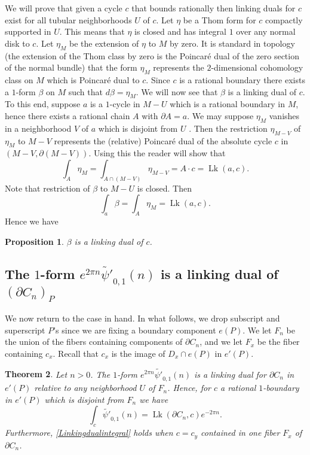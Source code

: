 \documentclass[12pt,leqno]{amsart}
\numberwithin{equation}{section}
\theoremstyle{plain}
\newtheorem{theorem}{Theorem}[section]
\newtheorem{proposition}[theorem]{Proposition}
\theoremstyle{definition}
\theoremstyle{remark}
\newcommand{\Lk}{\operatorname{Lk}}
\begin{document}
We will prove that given a cycle $c$ that bounds rationally then linking duals for $c$  exist for all tubular neighborhoods $U$ of $c$.  Let $\eta$ be a Thom form for $c$
compactly supported in $U$. This means that $\eta$ is closed and has integral $1$ over any normal disk to $c$. Let $\eta_M$ be the extension of $\eta$ to $M$ by zero.  It is standard in topology (the extension of the Thom class by zero is the Poincar\'e dual of the zero section of the normal bundle) that the form  $\eta_M$ represents the $2$-dimensional cohomology class on $M$ which is Poincar\'e dual to $c$. Since $c$ is a rational boundary there exists a $1$-form $\beta$ on $M$ such that $d \beta = \eta_M$. We will now see that $\beta$ is a linking dual of $c$.  To this end,  suppose  $a$ is a $1$-cycle in $M -U$ which is a rational boundary in $M$, hence there exists a rational
chain $A$ with $\partial A = a$.  We may suppose $\eta_M$ vanishes in a neighborhood $V$ of $a$ which is disjoint from $U$ .  Then the restriction $\eta_{M-V}$ of $\eta_M$ to $M-V$ represents the (relative) Poincar\'e dual of the absolute cycle $c$ in $(M-V, \partial (M-V))$. Using this
the reader will show that
\begin{equation*} \label{firstequation}
 \int_A \eta_M = \int_{A \cap (M-V)} \eta_{M-V}  = A \cdot c = \Lk(a,c).
\end{equation*}
 Note that restriction of $\beta$ to $M-U$ is closed. Then
\[
\int_a \beta  = \int_A \eta_M = \Lk(a,c).
\]
Hence we have 
\begin{proposition} \label{linkingdualprop}
$\beta$ is a linking dual of $c$. 
\end{proposition}


\subsection{The $1$-form $e^{2 \pi n} \tilde{\psi'}_{0,1}(n)$ is a linking dual of $(\partial C_n)_P$}
We now return to the case in hand. In what follows, we drop subscript and superscript $P$'s since we are fixing a boundary component $e(P)$.
We let $F_n$ be the union of the fibers containing components of $\partial C_n$, and we let $F_x$ be the fiber containing $c_x$. Recall that $c_x$ is the image of $D_x \cap e(P)$ in $e'(P)$. 

\begin{theorem}\label{linking-dual}
Let $n>0$. The $1$-form $e^{2 \pi n} \tilde{\psi'}_{0,1}(n)$ is a linking dual for $\partial C_n$ in $e'(P)$ relative to any neighborhood
$U$ of $F_n$.  Hence, for $c$ a rational $1$-boundary in $e'(P)$ which is disjoint from $F_n$ we have
\begin{equation}\label{Linkingdualintegral}
\int_c  \tilde{\psi'}_{0,1}(n) =  \Lk(\partial C_n,c) e^{- 2 \pi n}. 
\end{equation}
Furthermore, \eqref{Linkingdualintegral} holds when $c=c_y$ contained in one fiber $F_x$ of $\partial C_n$.
\end{theorem}
\end{document}

